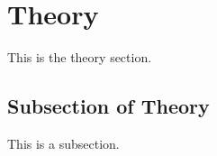 \section{Theory}
\label{sec:theory}
This is the theory section. \\

\lipsum[4-10]

\subsection{Subsection of Theory}
This is a subsection. \\

\lipsum[11-12]